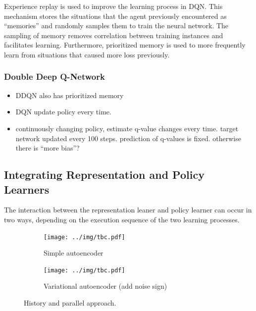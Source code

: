 Experience replay is used to improve the learning process in DQN. 
This mechanism stores the situations that the agent previously encountered as ``memories'' and randomly samples them to train the neural network. 
The sampling of memory removes correlation between training instances and facilitates learning.
Furthermore, prioritized memory \citep{prioritized_memory} is used to more frequently learn from situations that caused more loss previously. %



\subsubsection{Double Deep Q-Network}
\begin{itemize}
	\item DDQN \citep{DDQN} also has prioritized memory 
	\item DQN update policy every time. 
	\item continuously changing policy, estimate q-value changes every time.
	target network updated every 100 steps. prediction of q-values is fixed. otherwise there is ``more bias''?
\end{itemize}

\subsection{Integrating Representation and Policy Learners}
The interaction between the representation leaner and policy learner can occur in two ways, depending on the execution sequence of the two learning processes.

\begin{figure}[ht!]
	\centering
	\begin{subfigure}{0.45\columnwidth}
		\centering
		\texttt{[image: ../img/tbc.pdf]}
		\caption{Simple autoencoder}
		\label{subfig:repr_learner_simple_autoencoder}
	\end{subfigure}%
	
	\begin{subfigure}{0.45\columnwidth}
		\centering
		\texttt{[image: ../img/tbc.pdf]}
		\caption{Variational autoencoder (add noise sign)}
		\label{subfig:repr_learner_vae}
	\end{subfigure}
	\caption{History and parallel approach.
	}
	\label{fig:approaches}
\end{figure}

